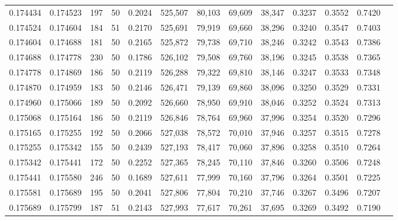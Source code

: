 \begin{tabular}{rrrrrrrrrrrrr}
0.174434 & 0.174523 &   197 &  50 &                                     0.2024 & 525,507 &  80,103 &  69,609 &  38,347 & 0.3237 & 0.3552 & 0.7420 \\
0.174524 & 0.174604 &   184 &  51 &                                     0.2170 & 525,691 &  79,919 &  69,660 &  38,296 & 0.3240 & 0.3547 & 0.7403 \\
0.174604 & 0.174688 &   181 &  50 &                                     0.2165 & 525,872 &  79,738 &  69,710 &  38,246 & 0.3242 & 0.3543 & 0.7386 \\
0.174688 & 0.174778 &   230 &  50 &                                     0.1786 & 526,102 &  79,508 &  69,760 &  38,196 & 0.3245 & 0.3538 & 0.7365 \\
0.174778 & 0.174869 &   186 &  50 &                                     0.2119 & 526,288 &  79,322 &  69,810 &  38,146 & 0.3247 & 0.3533 & 0.7348 \\
0.174870 & 0.174959 &   183 &  50 &                                     0.2146 & 526,471 &  79,139 &  69,860 &  38,096 & 0.3250 & 0.3529 & 0.7331 \\
0.174960 & 0.175066 &   189 &  50 &                                     0.2092 & 526,660 &  78,950 &  69,910 &  38,046 & 0.3252 & 0.3524 & 0.7313 \\
0.175068 & 0.175164 &   186 &  50 &                                     0.2119 & 526,846 &  78,764 &  69,960 &  37,996 & 0.3254 & 0.3520 & 0.7296 \\
0.175165 & 0.175255 &   192 &  50 &                                     0.2066 & 527,038 &  78,572 &  70,010 &  37,946 & 0.3257 & 0.3515 & 0.7278 \\
0.175255 & 0.175342 &   155 &  50 &                                     0.2439 & 527,193 &  78,417 &  70,060 &  37,896 & 0.3258 & 0.3510 & 0.7264 \\
0.175342 & 0.175441 &   172 &  50 &                                     0.2252 & 527,365 &  78,245 &  70,110 &  37,846 & 0.3260 & 0.3506 & 0.7248 \\
0.175441 & 0.175580 &   246 &  50 &                                     0.1689 & 527,611 &  77,999 &  70,160 &  37,796 & 0.3264 & 0.3501 & 0.7225 \\
0.175581 & 0.175689 &   195 &  50 &                                     0.2041 & 527,806 &  77,804 &  70,210 &  37,746 & 0.3267 & 0.3496 & 0.7207 \\
0.175689 & 0.175799 &   187 &  51 &                                     0.2143 & 527,993 &  77,617 &  70,261 &  37,695 & 0.3269 & 0.3492 & 0.7190 \\

\end{tabular}
